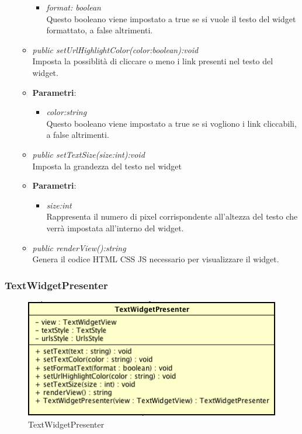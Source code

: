 \begin{itemize}
\begin{itemize}
{\begin{itemize}
		\item \textit{format: boolean}\\
		Questo booleano viene impostato a true se si vuole il testo del widget formattato, a false altrimenti.
		\end{itemize}}
	\item \textit{public setUrlHighlightColor(color:boolean):void}\\
	Imposta la possiblità di cliccare o meno i link presenti nel testo del widget.
		\item{\textbf{Parametri}: \begin{itemize}
		\item \textit{color:string}\\
		Questo booleano viene impostato a true se si vogliono i link cliccabili, a false altrimenti.
		\end{itemize}}
	\item \textit{public setTextSize(size:int):void}\\
	Imposta la grandezza del testo nel widget
		\item{\textbf{Parametri}: \begin{itemize}
		\item \textit{size:int}\\
		Rappresenta il numero di pixel corrispondente all'altezza del testo che verrà impostata all'interno del widget.
		\end{itemize}}
	\item \textit{public renderView():string}\\
	Genera il codice HTML CSS JS necessario per visualizzare il widget.
	\end{itemize}
\end{itemize}

\subsubsection{TextWidgetPresenter}

\label{TextWidgetPresenter}
\begin{figure}[ht]
	\centering
	\includegraphics[scale=0.5]{Sezioni/SottosezioniST/img/TextWidgetPresenter.png}
	\caption{TextWidgetPresenter}
\end{figure}


